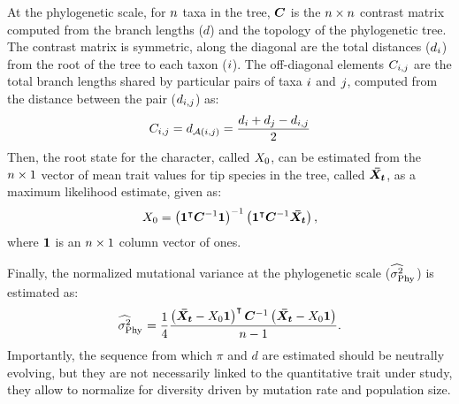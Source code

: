 \documentclass{article}
\begin{document}
At the phylogenetic scale, for $n$ taxa in the tree, $\bm{C}$ is the $n \times n$ contrast matrix computed from the branch lengths ($d$) and the topology of the phylogenetic tree.
The contrast matrix is symmetric, along the diagonal are the total distances ($d_{i}$) from the root of the tree to each taxon ($i$).
The off-diagonal elements $C_{i,j}$ are the total branch lengths shared by particular pairs of taxa $i$ and $j$, computed from the distance between the pair ($d_{i,j}$) as:
\begin{gather}
    C_{i,j} = d_{\mathcal{A}(i, j)} = \frac{d_{i} + d_{j} - d_{i,j}}{2}
\end{gather}
Then, the root state for the character, called $X_{0}$, can be estimated from the $n \times 1$ vector of mean trait values for tip species in the tree, called $\bm{\bar{X_{t}}}$, as a maximum likelihood estimate\cite{omeara_testing_2006}, given as:
\begin{gather}
    X_{0} = \left( \bm{1}^{\intercal} \bm{C}^{-1} \bm{1} \right)^{-1} \left( \bm{1}^{\intercal} \bm{C}^{-1} \bm{\bar{X_{t}}} \right), \label{eq:estimated-root-trait}
\end{gather}
where $\bm{1}$ is an $n \times 1$ column vector of ones.

Finally, the normalized mutational variance at the phylogenetic scale ($\EstRatePhy$) is estimated\cite{omeara_testing_2006} as:
\begin{gather}
    \EstRatePhy = \frac{1}{4}\frac{\left( \VecTrait -  \RootTrait \VecOne \right)\tr \Cr\inv \left( \VecTrait -  \RootTrait  \VecOne  \right)}{\NbrSpecies - 1}. \label{eq:estimated-rate-phy}
\end{gather}
Importantly, the sequence from which $\pi$ and $d$ are estimated should be neutrally evolving, but they are not necessarily linked to the quantitative trait under study, they allow to normalize for diversity driven by mutation rate and population size.
\end{document}
